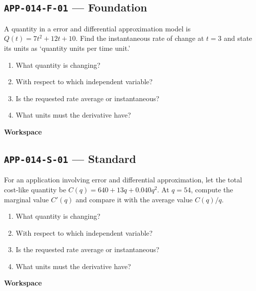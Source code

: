 \documentclass[11pt]{book}
\newcommand{\pid}[1]{\texttt{#1}}
\newcommand{\workspace}{\par\vspace{0.7in}\hrulefill\par\vspace{0.55in}\hrulefill\par}
\begin{document}
\subsection*{\pid{APP-014-F-01} — Foundation}
\begin{problembox}
A quantity in a error and differential approximation model is $Q(t)=7t^2+12t+10$. Find the instantaneous rate of change at $t=3$ and state its units as ‘quantity units per time unit.’
\end{problembox}
\begin{promptbox}\begin{enumerate}
\item What quantity is changing?
\item With respect to which independent variable?
\item Is the requested rate average or instantaneous?
\item What units must the derivative have?
\end{enumerate}\end{promptbox}
\textbf{Workspace}\workspace
{}
\subsection*{\pid{APP-014-S-01} — Standard}
\begin{problembox}
For an application involving error and differential approximation, let the total cost-like quantity be $C(q)=640+13q+0.040q^2$. At $q=54$, compute the marginal value $C'(q)$ and compare it with the average value $C(q)/q$.
\end{problembox}
\begin{promptbox}\begin{enumerate}
\item What quantity is changing?
\item With respect to which independent variable?
\item Is the requested rate average or instantaneous?
\item What units must the derivative have?
\end{enumerate}\end{promptbox}
\textbf{Workspace}\workspace
{}
\end{document}

